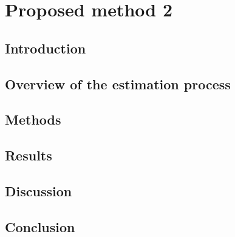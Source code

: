 \chapter{Proposed method 2}
\label{chapter:method_2} 


\section{Introduction}

\lipsum[2-4]

\section{Overview of the estimation process}

\lipsum[2-4]

\section{Methods}

\lipsum[2-4]

\section{Results}

\lipsum[2-4]

\section{Discussion}

\lipsum[2-4]

\section{Conclusion}

\lipsum[2-4]